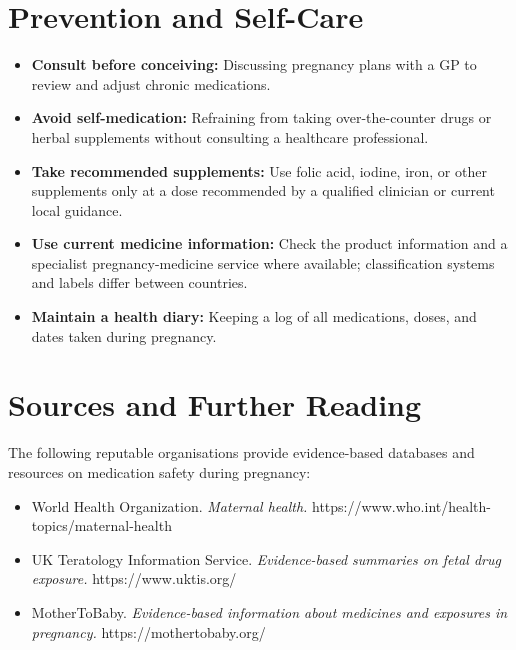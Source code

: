 \section*{Prevention and Self-Care}
\begin{itemize}
    \item \textbf{Consult before conceiving:} Discussing pregnancy plans with a GP to review and adjust chronic medications.
    \item \textbf{Avoid self-medication:} Refraining from taking over-the-counter drugs or herbal supplements without consulting a healthcare professional.
    \item \textbf{Take recommended supplements:} Use folic acid, iodine, iron, or other supplements only at a dose recommended by a qualified clinician or current local guidance.
    \item \textbf{Use current medicine information:} Check the product information and a specialist pregnancy-medicine service where available; classification systems and labels differ between countries.
    \item \textbf{Maintain a health diary:} Keeping a log of all medications, doses, and dates taken during pregnancy.
\end{itemize}

\section*{Sources and Further Reading}
The following reputable organisations provide evidence-based databases and resources on medication safety during pregnancy:
\begin{itemize}
    \item World Health Organization. \textit{Maternal health.} https://www.who.int/health-topics/maternal-health
    \item UK Teratology Information Service. \textit{Evidence-based summaries on fetal drug exposure.} https://www.uktis.org/
    \item MotherToBaby. \textit{Evidence-based information about medicines and exposures in pregnancy.} https://mothertobaby.org/
\end{itemize}

